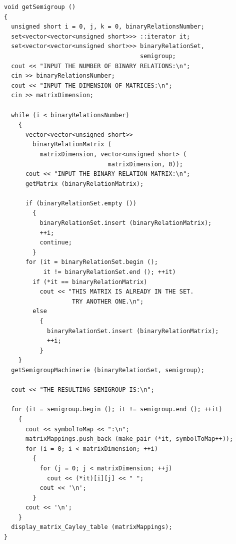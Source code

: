 \documentclass[spec, och, otchet, hidelinks]{SCWorks}
\begin{document}
\begin{lstlisting}[caption=Код программы., mathescape]
void getSemigroup ()
{
  unsigned short i = 0, j, k = 0, binaryRelationsNumber;
  set<vector<vector<unsigned short>>> ::iterator it;
  set<vector<vector<unsigned short>>> binaryRelationSet, 
                                      semigroup;
  cout << "INPUT THE NUMBER OF BINARY RELATIONS:\n";
  cin >> binaryRelationsNumber;
  cout << "INPUT THE DIMENSION OF MATRICES:\n";
  cin >> matrixDimension;

  while (i < binaryRelationsNumber)
    {
      vector<vector<unsigned short>> 
        binaryRelationMatrix (
          matrixDimension, vector<unsigned short> (
                             matrixDimension, 0));
      cout << "INPUT THE BINARY RELATION MATRIX:\n";
      getMatrix (binaryRelationMatrix);

      if (binaryRelationSet.empty ())
        {
          binaryRelationSet.insert (binaryRelationMatrix);
          ++i;
          continue;
        }
      for (it = binaryRelationSet.begin (); 
           it != binaryRelationSet.end (); ++it)
        if (*it == binaryRelationMatrix)
          cout << "THIS MATRIX IS ALREADY IN THE SET. 
                   TRY ANOTHER ONE.\n";
        else
          {
            binaryRelationSet.insert (binaryRelationMatrix);
            ++i;
          }
    }
  getSemigroupMachinerie (binaryRelationSet, semigroup);

  cout << "THE RESULTING SEMIGROUP IS:\n";

  for (it = semigroup.begin (); it != semigroup.end (); ++it)
    {
      cout << symbolToMap << ":\n";
      matrixMappings.push_back (make_pair (*it, symbolToMap++));
      for (i = 0; i < matrixDimension; ++i)
        {
          for (j = 0; j < matrixDimension; ++j)
            cout << (*it)[i][j] << " ";
          cout << '\n';
        }
      cout << '\n';
    }
  display_matrix_Cayley_table (matrixMappings);
}
\end{lstlisting}
\conclusion
\end{document}
